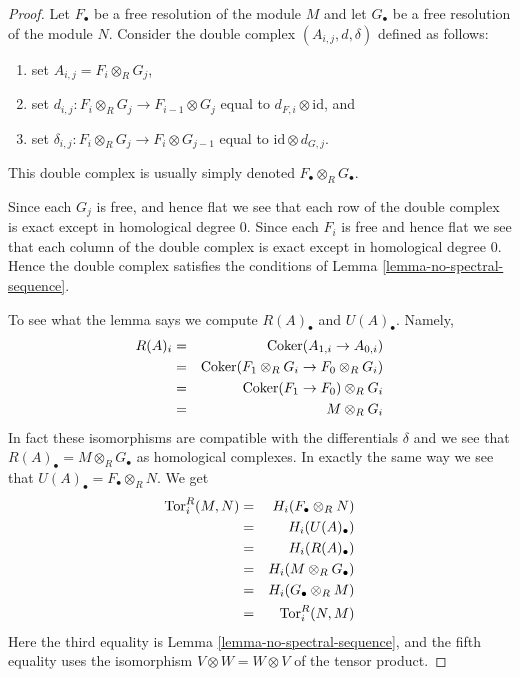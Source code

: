 \begin{proof}
Let $F_\bullet$ be a free resolution of the module $M$ and
let $G_\bullet$ be a free resolution of the module $N$.
Consider the double complex $(A_{i,j}, d, \delta)$ defined
as follows:
\begin{enumerate}
\item set $A_{i, j} = F_i \otimes_R G_j$, 
\item set $d_{i, j} : F_i \otimes_R G_j \to F_{i-1} \otimes G_j$
equal to $d_{F, i} \otimes \text{id}$, and
\item set $\delta_{i, j} : F_i \otimes_R G_j \to F_i \otimes G_{j-1}$
equal to $\text{id} \otimes d_{G, j}$.
\end{enumerate}
This double complex is usually simply denoted $F_\bullet \otimes_R G_\bullet$.

\medskip\noindent
Since each $G_j$ is free, and hence flat we see that each
row of the double complex is exact except in homological
degree $0$. Since each $F_i$ is free and hence flat we see that each
column of the double complex is exact except in homological
degree $0$. Hence the double complex satisfies the conditions
of Lemma \ref{lemma-no-spectral-sequence}.

\medskip\noindent
To see what the lemma says we compute $R(A)_\bullet$ and $U(A)_\bullet$.
Namely,
\begin{eqnarray*}
R(A)_i & = & \text{Coker}(A_{1, i} \to A_{0,i}) \cr
& = & \text{Coker}(F_1 \otimes_R G_i \to F_0 \otimes_R G_i) \cr
& = & \text{Coker}(F_1 \to F_0) \otimes_R G_i \cr
& = & M \otimes_R G_i
\end{eqnarray*}
In fact these isomorphisms are compatible with the differentials
$\delta$ and we see that $R(A)_\bullet = M \otimes_R G_\bullet$
as homological complexes. In exactly the same way we see that
$U(A)_\bullet = F_\bullet \otimes_R N$. We get
\begin{eqnarray*}
\text{Tor}_i^R(M, N)
& = & H_i(F_\bullet \otimes_R N) \cr
& = & H_i(U(A)_\bullet) \cr
& = & H_i(R(A)_\bullet) \cr
& = & H_i(M \otimes_R G_\bullet) \cr
& = & H_i(G_\bullet\otimes_R M) \cr
& = & \text{Tor}_i^R(N, M)
\end{eqnarray*}
Here the third equality is Lemma \ref{lemma-no-spectral-sequence}, and
the fifth equality uses the isomorphism $V\otimes W = W \otimes V$
of the tensor product.


\end{proof}
